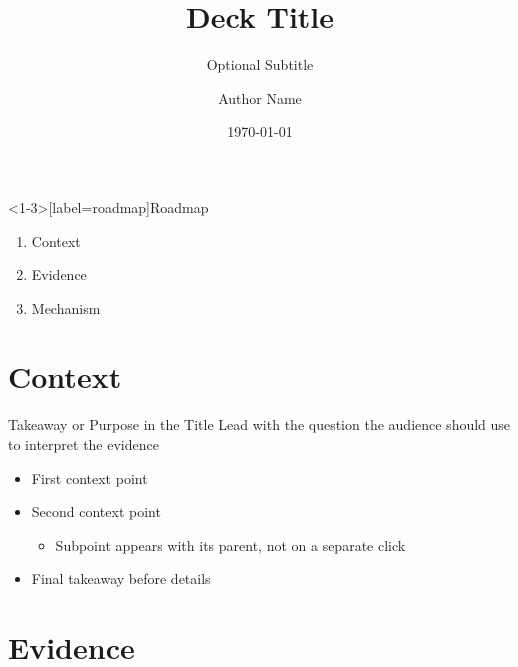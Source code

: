 \documentclass[10pt,english,aspectratio=169,t]{beamer}
\title{Deck Title}
\subtitle{Optional Subtitle}
\author{Author Name}
\date{\today}
\begin{document}
\maketitle

\begin{frame}<1-3>[label=roadmap]{Roadmap}
  \begin{enumerate}[<+->]
    \setlength{\itemsep}{1em}
    \item \alert<1,4>{Context}
    \item \alert<2,5>{Evidence}
    \item \alert<3,6>{Mechanism}
  \end{enumerate}
\end{frame}

\section{Context}

\begin{frame}{Takeaway or Purpose in the Title}
  Lead with the question the audience should use to interpret the evidence

  \begin{itemize}[<+->]
    \item First context point
    \item Second context point
      \begin{itemize}[<.->]
        \item Subpoint appears with its parent, not on a separate click
      \end{itemize}
    \item Final takeaway before details
  \end{itemize}
\end{frame}

\section{Evidence}

\end{document}
